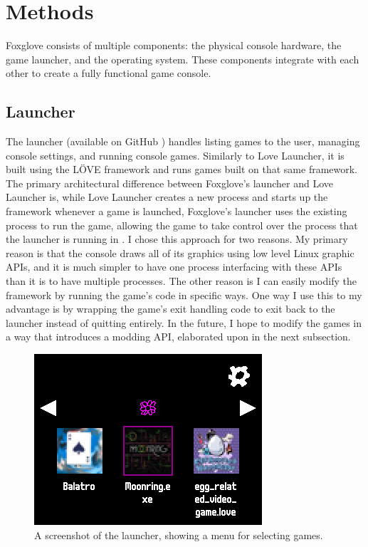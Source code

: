 \documentclass[10pt,twocolumn]{article}
\begin{document}
\section{Methods}

Foxglove consists of multiple components:
the physical console hardware, the
game launcher, and the operating system. These components integrate with each
other to create a fully functional game console.

\subsection{Launcher}

The launcher (available on GitHub
\cite{perry_lavenderperryfoxglove-launcher_2025})
handles listing games to the user, managing console settings, and
running console games. Similarly to Love Launcher,
it is built using the LÖVE
framework and runs games built on that same framework. The primary architectural
difference between Foxglove's launcher and
Love Launcher is, while Love Launcher
creates a new process and starts up the framework whenever a game is launched,
Foxglove's launcher uses the existing process to run the game,
allowing the game
to take control over the process that the launcher is running in
\cite{noauthor_glitchapplovelauncher_nodate}. I chose this approach for two
reasons. My primary reason is that the console draws all of its graphics using
low level Linux graphic APIs, and it is much simpler to have one process
interfacing with these APIs than it is to have multiple processes. The other
reason is I can easily modify the framework by running the game's code in
specific ways. One way I use this to my advantage is by wrapping the game's exit
handling code to exit back to the launcher instead of quitting entirely. In the
future, I hope to modify the games in a way that introduces a modding API,
elaborated upon in the next subsection.

\begin{figure}[!htb]
    \centering
    \includegraphics[width=.95\linewidth]{launcher.png}
    \caption{
        A screenshot of the launcher, showing a menu for selecting games.
    }
    \label{fig:launcher}
\end{figure}
\end{document}
